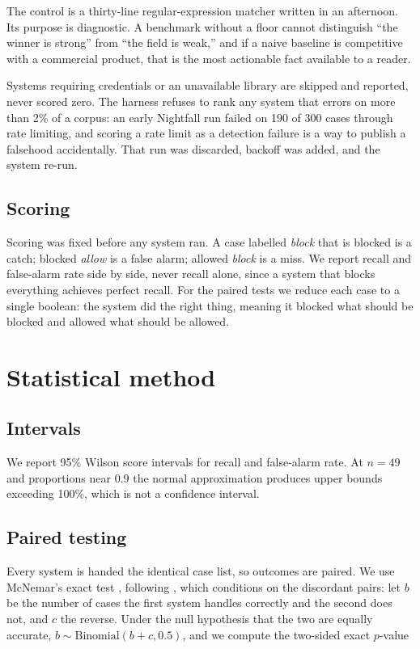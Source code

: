 \documentclass[11pt]{article}
\begin{document}
The control is a thirty-line regular-expression matcher written in an afternoon.
Its purpose is diagnostic. A benchmark without a floor cannot distinguish
``the winner is strong'' from ``the field is weak,'' and if a naive baseline is
competitive with a commercial product, that is the most actionable fact
available to a reader.

Systems requiring credentials or an unavailable library are skipped and reported,
never scored zero. The harness refuses to rank any system that errors on more
than 2\% of a corpus: an early Nightfall run failed on 190 of 300 cases through
rate limiting, and scoring a rate limit as a detection failure is a way to
publish a falsehood accidentally. That run was discarded, backoff was added, and
the system re-run.

\subsection{Scoring}

Scoring was fixed before any system ran. A case labelled \emph{block} that is
blocked is a catch; blocked \emph{allow} is a false alarm; allowed \emph{block}
is a miss. We report recall and false-alarm rate side by side, never recall
alone, since a system that blocks everything achieves perfect recall. For the
paired tests we reduce each case to a single boolean: the system did the right
thing, meaning it blocked what should be blocked and allowed what should be
allowed.

\section{Statistical method}

\subsection{Intervals}

We report 95\% Wilson score intervals \citep{wilson1927} for recall and
false-alarm rate. At $n = 49$ and proportions near $0.9$ the normal approximation
produces upper bounds exceeding 100\%, which is not a confidence interval.

\subsection{Paired testing}

Every system is handed the identical case list, so outcomes are paired. We use
McNemar's exact test \citep{mcnemar1947}, following \citet{dietterich1998}, which
conditions on the discordant pairs: let $b$ be the number of cases the first
system handles correctly and the second does not, and $c$ the reverse. Under the
null hypothesis that the two are equally accurate, $b \sim \text{Binomial}(b+c,
0.5)$, and we compute the two-sided exact $p$-value
\end{document}

